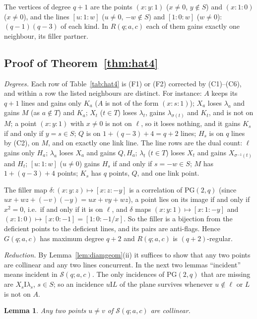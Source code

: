 \documentclass[11pt]{amsart}
\newtheorem{lemma}[theorem]{Lemma}
\theoremstyle{definition}
\theoremstyle{remark}
\numberwithin{equation}{section}
\newcommand{\PG}{\mathrm{PG}}
\newcommand{\I}{\mathrel{\mathrm I}}
\newcommand{\cS}{\mathcal S}
\begin{document}
The vertices of degree $q+1$ are the points $(x:y:1)$ ($x\ne0$, $y\notin S$) and $(x:1:0)$ ($x\ne0$), and the lines
$[u:1:w]$ ($u\ne0$, $-w\notin S$) and $[1:0:w]$ ($w\ne0$): $(q-1)(q-3)$ of each kind. In $R(q;a,c)$ each of them gains
exactly one neighbour, its filler partner.

\subsection{Proof of Theorem~\ref{thm:hat4}}

\emph{Degrees.} Each row of Table~\ref{tab:hat4} is (F1) or (F2) corrected by (C1)--(C6), and within a row the listed
neighbours are distinct. For instance: $A$ keeps its $q+1$ lines and gains only $K_a$ ($A$ is not of the form
$(x:s:1)$); $X_a$ loses $\lambda_a$ and gains $M$ (as $a\notin T$) and $K_a$; $X_t$ ($t\in T$) loses $\lambda_t$, gains
$\lambda_{\sigma(t)}$ and $K_t$, and is not on $M$; a point $(x:y:1)$ with $x\ne0$ is not on $\ell$, so it loses
nothing, and it gains $K_s$ if and only if $y=s\in S$; $Q$ is on $1+(q-3)+4=q+2$ lines; $H_s$ is on $q$ lines by (C2),
on $M$, and on exactly one link line. The line rows are the dual count: $\ell$ gains only $H_a$; $\lambda_a$ loses
$X_a$ and gains $Q,H_a$; $\lambda_t$ ($t\in T$) loses $X_t$ and gains $X_{\sigma^{-1}(t)}$ and $H_t$; $[u:1:w]$ ($u\ne0$)
gains $H_s$ if and only if $s=-w\in S$; $M$ has $1+(q-3)+4$ points; $K_s$ has $q$ points, $Q$, and one link point.

The filler map $\delta:(x:y:z)\mapsto[x:z:-y]$ is a correlation of $\PG(2,q)$ (since $ux+wz+(-v)(-y)=ux+vy+wz$), a point
lies on its image if and only if $x^2=0$, i.e.\ if and only if it is on $\ell$, and $\delta$ maps $(x:y:1)\mapsto[x:1:-y]$
and $(x:1:0)\mapsto[x:0:-1]=[1:0:-1/x]$. So the filler is a bijection from the deficient points to the deficient lines,
and its pairs are anti-flags. Hence $G(q;a,c)$ has maximum degree $q+2$ and $R(q;a,c)$ is $(q+2)$-regular.

\emph{Reduction.} By Lemma~\ref{lem:diamgeom}(ii) it suffices to show that any two points are collinear and any two lines
concurrent. In the next two lemmas ``incident'' means incident in $\cS(q;a,c)$. The only incidences of $\PG(2,q)$ that are
missing are $X_s\I\lambda_s$, $s\in S$; so an incidence $u\I L$ of the plane survives whenever $u\notin\ell$ or $L$ is
not on $A$.

\begin{lemma}\label{lem:hat4points}
Any two points $u\ne v$ of $\cS(q;a,c)$ are collinear.
\end{lemma}
\end{document}
